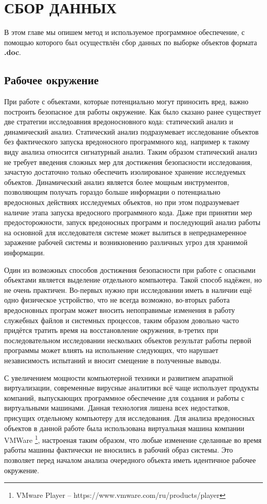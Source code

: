 \chapter{СБОР ДАННЫХ}

В этом главе мы опишем метод и используемое программное обеспечение, с помощью которого был осуществлён сбор данных по выборке объектов формата \textbf{.doc}.

\section{Рабочее окружение}

При работе с объектами, которые потенциально могут приносить вред, важно построить безопасное для работы окружение.
Как было сказано ранее существует две стратегии исследоавния вредоносновного кода: статический анализ и динамический анализ.
Статический анализ подразумевает исследование объектов без фактического запуска вредоносного программного код, например к такому виду анализа относится сигнатурный анализ.
Таким образом статический анализ не требует введения сложных мер для достижения безопасности исследования, зачастую достаточно только обеспечить изолированое хранение исследуемых объектов.
Динамический анализ является более мощным инструментов, позволяющим получать гораздо больше информации о потенциально вредосноных действиях исследуемых объектов, но при этом подразумевает наличие этапа запуска вредосного программного кода.
Даже при принятии мер предосторожности, запуск вредоносных программ и последующий анализ работы на основной для исследователя системе может вылиться в непреднамеренное заражение рабочей системы и возникновению различных угроз для хранимой информации.

Один из возможных способов достижения безопасности при работе с опасными объектами является выделение отдельного компьютера.
Такой способ надёжен, но не очень практичен. Во-первых нужно при исследовании иметь в наличии ещё одно физическое устройство, что не всегда возможно, во-вторых работа вредосновных програм может вносить непоправимые изменения в работу служебных файлов и системных процессов, таким образом довольно часто придётся тратить время на восстановление окружения, в-третих при последовательном исследовании нескольких объектов результат работы первой программы может влиять на испольнение следующих, что нарушает независимость испытаний и вносит смещение в полученные выводы.

С увеличением мощности компьютерной техники и развитием апаратной виртуализации, современные вирусные аналитики всё чаще использует продукты компаний, выпускающих программное обеспечение для создания и работы с виртуальными машинами. 
Данная технология лишена всех недостатков, присущих отдельному компьютеру для исследования.
Для анализа вредоносных объектов в данной работе была использована виртуальная машина компании VMWare \footnote{VMware Player -- https://www.vmware.com/ru/products/player}, настроеная таким образом, что любые изменение сделанные во время работы машины фактически не вносились в рабочий образ системы.
Это позволяет перед началом анализа очередного объекта иметь идентичное рабочее окружение.

